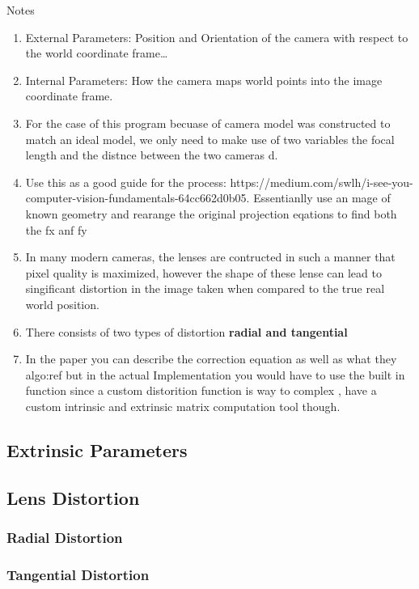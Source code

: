 \documentclass[11pt]{scrartcl}
\begin{document}
\begin{remark}
  Notes{\begin{enumerate}
        \item  External Parameters: Position and Orientation of the camera with respect to the world coordinate frame\dots
        \item Internal Parameters: How the camera maps world points into the image coordinate frame.
        \item For the case of this program becuase of camera model was constructed to match an ideal model, we only need to make use of two variables the focal length and the distnce between the two cameras d.
        \item Use this as a good guide for the process: https://medium.com/swlh/i-see-you-computer-vision-fundamentals-64cc662d0b05.
              Essentianlly use an mage of known geometry and rearange the original projection eqations to find both the fx anf fy
        \item In many modern cameras, the lenses are contructed in such a manner that pixel quality is maximized, however the shape of these lense
              can lead to singificant distortion in the image taken when compared to the true real world position.
        \item There consists of two types of distortion \textbf{radial and tangential}
        \item In the paper you can describe the correction equation as well as what they algo:ref
              but in the actual Implementation you would have to use the built in function since a custom distorition function is way to complex
              , have a custom intrinsic and extrinsic matrix computation tool though.
      \end{enumerate}} %
  \label{par:Notes}

  \subsection{Extrinsic Parameters}

  \subsection{Lens Distortion}

  \subsubsection{Radial Distortion}
  \subsubsection{Tangential Distortion}


\end{remark}
\end{document}
